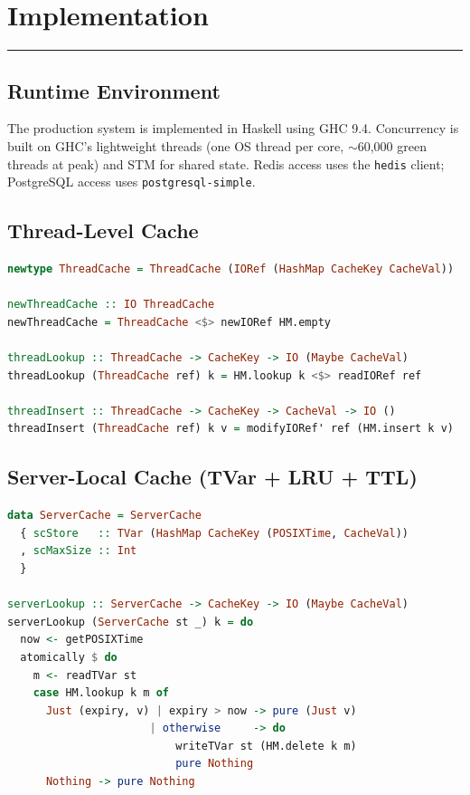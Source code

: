 \documentclass[12pt,a4paper,oneside]{report}
\begin{document}

\chapter{Implementation}
\label{chap:impl}
\vspace{-1cm}
\noindent \rule{6.6in}{0.01in}

\section{Runtime Environment}
The production system is implemented in Haskell using GHC 9.4. Concurrency is built on GHC's lightweight threads (one OS thread per core, $\sim$60{,}000 green threads at peak) and STM for shared state. Redis access uses the \texttt{hedis} client; PostgreSQL access uses \texttt{postgresql-simple}.

\section{Thread-Level Cache}
\begin{lstlisting}[language=Haskell, caption=Thread-level cache (request-scoped)]
newtype ThreadCache = ThreadCache (IORef (HashMap CacheKey CacheVal))

newThreadCache :: IO ThreadCache
newThreadCache = ThreadCache <$> newIORef HM.empty

threadLookup :: ThreadCache -> CacheKey -> IO (Maybe CacheVal)
threadLookup (ThreadCache ref) k = HM.lookup k <$> readIORef ref

threadInsert :: ThreadCache -> CacheKey -> CacheVal -> IO ()
threadInsert (ThreadCache ref) k v = modifyIORef' ref (HM.insert k v)
\end{lstlisting}

\section[Server-Local Cache]{Server-Local Cache (TVar + LRU + TTL)}
\begin{lstlisting}[language=Haskell, caption=Server-local cache (node-scoped)]
data ServerCache = ServerCache
  { scStore   :: TVar (HashMap CacheKey (POSIXTime, CacheVal))
  , scMaxSize :: Int
  }

serverLookup :: ServerCache -> CacheKey -> IO (Maybe CacheVal)
serverLookup (ServerCache st _) k = do
  now <- getPOSIXTime
  atomically $ do
    m <- readTVar st
    case HM.lookup k m of
      Just (expiry, v) | expiry > now -> pure (Just v)
                      | otherwise     -> do
                          writeTVar st (HM.delete k m)
                          pure Nothing
      Nothing -> pure Nothing
\end{lstlisting}
\end{document}
